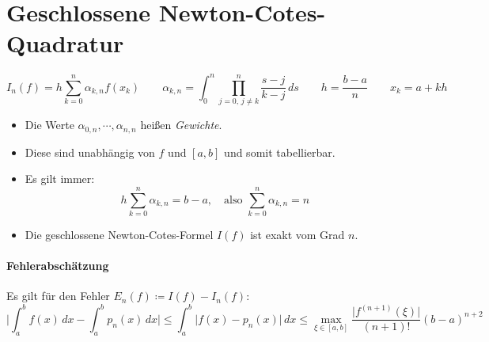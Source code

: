 \documentclass[a4paper, 11pt, accentcolor = tud3b]{tudreport}
\newcommand{\abs}[1]{\ensuremath{{\lvert #1 \rvert}}}
\begin{document}
	    \section{Geschlossene Newton-Cotes-Quadratur} %
	        \begin{equation*}
		        I_n(f) = h \sum_{k=0}^{n} \alpha_{k,n} f(x_k) \qquad \alpha_{k,n} = \int_{0}^{n} \! \prod_{j = 0,\, j \neq k}^{n} \frac{s-j}{k-j} \, ds \qquad h = \frac{b-a}{n} \qquad x_k = a + kh
	        \end{equation*}
	        \begin{itemize}
	        	\item Die Werte \( \alpha_{0, n}, \cdots, \alpha_{n, n} \) heißen \textit{Gewichte}.
	        	\item Diese sind unabhängig von \(f\) und \([a, b]\) und somit tabellierbar.
	        	\item Es gilt immer:
		        	\begin{equation*}
			        	h \sum_{k=0}^{n} \alpha_{k,n} = b - a, \quad\textrm{also } \sum_{k=0}^{n} \alpha_{k, n} = n
		        	\end{equation*}
		        \item Die geschlossene Newton-Cotes-Formel \(I(f)\) ist exakt vom Grad \(n\).
	        \end{itemize}
        
	        \paragraph{Fehlerabschätzung}
		        Es gilt für den Fehler \( E_n(f) \coloneqq I(f) - I_n(f) \):
		        \begin{equation*}
			        \Bigg\lvert \int_{a}^{b} \! f(x) \, dx - \int_{a}^{b} \! p_n(x) \, dx \Bigg\rvert \leq \int_{a}^{b} \! \abs{f(x) - p_n(x)} \, dx \leq \max_{\xi \in [a, b]} \frac{\abs{f^{(n + 1)}(\xi)}}{(n + 1)!} (b - a) ^ {n+2}
		        \end{equation*}
	        
\end{document}
